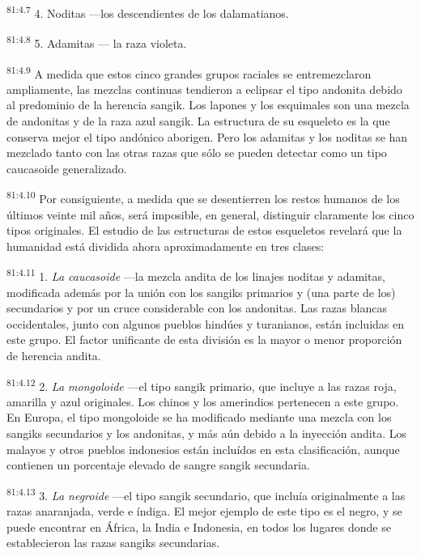 \par
\textsuperscript{81:4.7} 4. Noditas ---los descendientes de los dalamatianos.

\par
\textsuperscript{81:4.8} 5. Adamitas --- la raza violeta.

\par
\textsuperscript{81:4.9} A medida que estos cinco grandes grupos raciales se entremezclaron ampliamente, las mezclas continuas tendieron a eclipsar el tipo andonita debido al predominio de la herencia sangik. Los lapones y los esquimales son una mezcla de andonitas y de la raza azul sangik. La estructura de su esqueleto es la que conserva mejor el tipo andónico aborigen. Pero los adamitas y los noditas se han mezclado tanto con las otras razas que sólo se pueden detectar como un tipo caucasoide generalizado.

\par
\textsuperscript{81:4.10} Por consiguiente, a medida que se desentierren los restos humanos de los últimos veinte mil años, será imposible, en general, distinguir claramente los cinco tipos originales. El estudio de las estructuras de estos esqueletos revelará que la humanidad está dividida ahora aproximadamente en tres clases:

\par
\textsuperscript{81:4.11} 1. \textit{La caucasoide} ---la mezcla andita de los linajes noditas y adamitas, modificada además por la unión con los sangiks primarios y (una parte de los) secundarios y por un cruce considerable con los andonitas. Las razas blancas occidentales, junto con algunos pueblos hindúes y turanianos, están incluidas en este grupo. El factor unificante de esta división es la mayor o menor proporción de herencia andita.

\par
\textsuperscript{81:4.12} 2. \textit{La mongoloide} ---el tipo sangik primario, que incluye a las razas roja, amarilla y azul originales. Los chinos y los amerindios pertenecen a este grupo. En Europa, el tipo mongoloide se ha modificado mediante una mezcla con los sangiks secundarios y los andonitas, y más aún debido a la inyección andita. Los malayos y otros pueblos indonesios están incluídos en esta clasificación, aunque contienen un porcentaje elevado de sangre sangik secundaria.

\par
\textsuperscript{81:4.13} 3. \textit{La negroide} ---el tipo sangik secundario, que incluía originalmente a las razas anaranjada, verde e índiga. El mejor ejemplo de este tipo es el negro, y se puede encontrar en África, la India e Indonesia, en todos los lugares donde se establecieron las razas sangiks secundarias.


